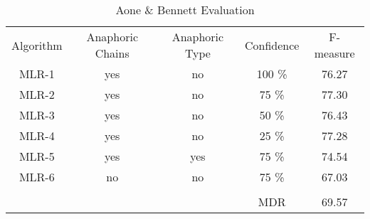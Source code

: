 
\begin{table}[h]
\begin{tabular}{|c|c|c|c|c|}
	\cline{1-5}
	Algorithm & Anaphoric Chains & Anaphoric Type& Confidence & F-measure \\ \cline{1-5}
	\cline{1-5}
	MLR-1 & yes & no & 100 \% &  76.27 \\ \cline{1-5}
	MLR-2 & yes & no & 75 \% & 77.30 \\ \cline{1-5}
	MLR-3 & yes & no & 50 \% & 76.43 \\ \cline{1-5}
	MLR-4 & yes & no & 25 \% & 77.28 \\ \cline{1-5}
	MLR-5 & yes & yes & 75 \% & 74.54 \\ \cline{1-5}
	MLR-6 & no & no & 75 \% & 67.03 \\ \cline{1-5}
	\multicolumn{5}{r}{}\\ \cline{4-5}
	\multicolumn{2}{r}{} & &  MDR & 69.57 \\
\cline{4-5}
	\end{tabular}
  \caption{Aone \& Bennett Evaluation}
     \label{table:aone1995evals}
\end{table}

